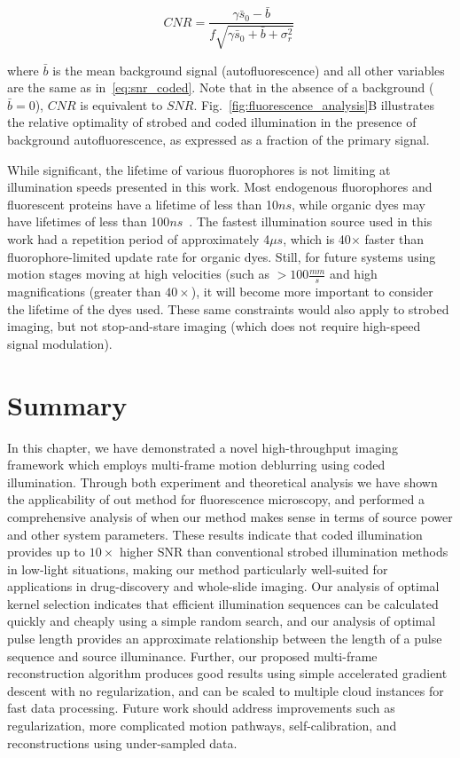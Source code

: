 \begin{equation}
    \label{eq:cnr}
    CNR  = \frac{\gamma\bar{s}_0 - \bar{b}}{f\sqrt{\gamma\bar{s}_0 + \bar{b} + \sigma^2_{r}}}\:
\end{equation}

\noindent where $\bar{b}$ is the mean background signal (autofluorescence) and all other variables are the same as in~\eqref{eq:snr_coded}. Note that in the absence of a background ($\bar{b} = 0$), $CNR$ is equivalent to $SNR$. Fig.~\ref{fig:fluorescence_analysis}B illustrates the relative optimality of strobed and coded illumination in the presence of background autofluorescence, as expressed as a fraction of the primary signal.

While significant, the lifetime of various fluorophores is not limiting at illumination speeds presented in this work. Most endogenous fluorophores and fluorescent proteins have a lifetime of less than 10$ns$, while organic dyes may have lifetimes of less than 100$ns$~\cite{fluorlifetime2010}. The fastest illumination source used in this work had a repetition period of approximately 4$\mu s$, which is 40$\times$ faster than fluorophore-limited update rate for organic dyes. Still, for future systems using motion stages moving at high velocities (such as $>100\frac{mm}{s}$ and high magnifications (greater than $40\times$), it will become more important to consider the lifetime of the dyes used. These same constraints would also apply to strobed imaging, but not stop-and-stare imaging (which does not require high-speed signal modulation).



\section{Summary}
In this chapter, we have demonstrated a novel high-throughput imaging framework which employs multi-frame motion deblurring using coded illumination. Through both experiment and theoretical analysis we have shown the applicability of out method for fluorescence microscopy, and performed a comprehensive analysis of when our method makes sense in terms of source power and other system parameters. These results indicate that coded illumination provides up to $10\times$ higher SNR than conventional strobed illumination methods in low-light situations, making our method particularly well-suited for applications in drug-discovery and whole-slide imaging. Our analysis of optimal kernel selection indicates that efficient illumination sequences can be calculated quickly and cheaply using a simple random search, and our analysis of optimal pulse length provides an approximate relationship between the length of a pulse sequence and source illuminance. Further, our proposed multi-frame reconstruction algorithm produces good results using simple accelerated gradient descent with no regularization, and can be scaled to multiple cloud instances for fast data processing. Future work should address improvements such as regularization, more complicated motion pathways, self-calibration, and reconstructions using under-sampled data.